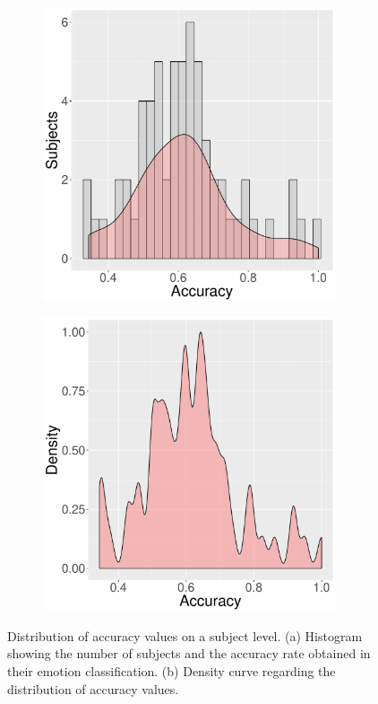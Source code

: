 \begin{figure}[ht]
\centering
  \begin{subfigure}[b]{0.5\textwidth}
    \includegraphics[width=0.95\textwidth]{Content/figures/experiment2-hist-user}
    \caption{}
    \label{fig:experiment2-chart-hist}
  \end{subfigure}%
  \begin{subfigure}[b]{0.5\textwidth}
    \centering
    \includegraphics[width=0.95\textwidth]{Content/figures/experiment2-density-user}
    \caption{}
    \label{fig:experiment2-chart-density}
  \end{subfigure}
  \caption{Distribution of accuracy values on a subject level. (a) Histogram showing the number of subjects and the accuracy rate obtained in their emotion classification. (b) Density curve regarding the distribution of accuracy values.}
  \label{fig:experiment2-result-charts}
\end{figure}

